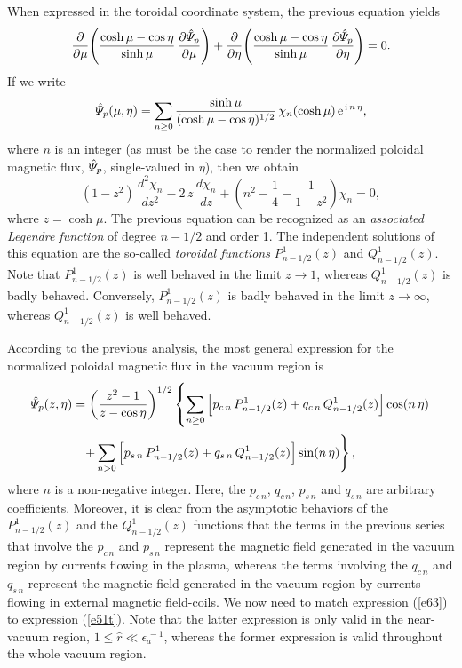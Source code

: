 \documentclass[12pt,prb,aps]{revtex4-1}
\begin{document}
When expressed in the toroidal coordinate system, the previous equation yields\,\cite{greene}
\begin{equation}
\frac{\partial}{\partial\mu}\!\left(\frac{\cosh\mu-\cos\eta}{\sinh\mu}\,\frac{\partial\hat{\mit\Psi}_p}{\partial\mu}\right)
+\frac{\partial}{\partial\eta}\!\left(\frac{\cosh\mu-\cos\eta}{\sinh\mu}\,\frac{\partial\hat{\mit\Psi}_p}{\partial\eta}\right)=0.
\end{equation}
If we write
\begin{equation}
\hat{\mit\Psi}_p(\mu,\eta)= \sum_{n\geq 0}\frac{\sinh\mu}{(\cosh\mu-\cos\eta)^{1/2}}\,\chi_n(\cosh\mu)\,{\rm e}^{\,{\rm i}\,n\,\eta},
\end{equation}
where $n$ is an integer (as must be the case to render the  normalized poloidal magnetic flux, $\hat{\mit\Psi}_p$,  single-valued in $\eta$), 
then we obtain
\begin{equation}
(1-z^2)\,\frac{d^2\chi_n}{dz^2}-2\,z\,\frac{d\chi_n}{dz} + \left(n^2-\frac{1}{4}-\frac{1}{1-z^{2}}\right)\chi_n= 0,
\end{equation}
where $z=\cosh\mu$.
The previous equation can be recognized as an {\em associated Legendre function}\/ of degree $n-1/2$ and order 1.\cite{abram}
The independent solutions of this equation are the so-called {\em toroidal functions}\/ $P_{n-1/2}^1(z)$ and $Q_{n-1/2}^1(z)$.\cite{abrama} Note that $P_{n-1/2}^1(z)$ is well behaved
in the limit $z\rightarrow 1$, whereas $Q_{n-1/2}^1(z)$ is badly behaved.  Conversely, $P_{n-1/2}^1(z)$ is badly behaved in the limit
$z\rightarrow\infty$, whereas $Q_{n-1/2}^1(z)$ is well behaved. 

According to the previous analysis, the most general expression for the normalized poloidal magnetic flux in the vacuum
region is\,\cite{greene}
\begin{align}\label{e63}
\hat{\mit\Psi}_p(z,\eta) &= \left(\frac{z^2-1}{z-\cos\eta}\right)^{1/2}\left\{\sum_{n\geq 0}\left[p_{c\,n}\,P_{n-1/2}^1(z)+q_{c\,n}\,Q_{n-1/2}^1(z)\right]\cos(n\,\eta)
\right.
\nonumber\\[0.5ex]&\phantom{=}\left.+\sum_{n>0}\left[p_{s\,n}\,P_{n-1/2}^1(z)+q_{s\,n}\,Q_{n-1/2}^1(z)\right]\sin(n\,\eta)\right\}, 
\end{align}
where $n$ is a non-negative integer. Here, the $p_{c\,n}$,  $q_{c\,n}$, $p_{s\,n}$ and $q_{s\,n}$ are arbitrary coefficients. Moreover, it is clear from the asymptotic
behaviors of the $P_{n-1/2}^1(z)$ and the $Q_{n-1/2}^1(z)$ functions that the terms in the previous series that involve the $p_{c\,n}$ and $p_{s\,n}$
represent the magnetic field generated in the vacuum region by currents flowing in the plasma, whereas the terms involving the
$q_{c\,n}$ and $q_{s\,n}$  represent the magnetic field generated in the vacuum region by currents flowing in external magnetic field-coils. 
We now need to match expression (\ref{e63}) to expression (\ref{e51t}). Note that the latter expression is only valid in the
near-vacuum region, $1\leq \hat{r}\ll \epsilon_{a}^{\,-1}$, whereas the former expression is valid throughout the whole vacuum
region.  
\end{document}
